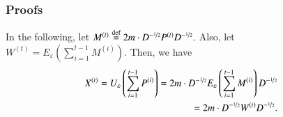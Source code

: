 \documentclass[twoside,leqno,twocolumn]{article}
\newcommand{\nfrac}{\nicefrac}
\renewcommand{\leq}{\leqslant}
\newcommand{\cI}{\mathcal I}
\newcommand{\defeq}{\stackrel{\textup{def}}{=}}
\newcommand{\Tr}{{\rm Tr}}
\newcommand{\e}{\epsilon}
\let\e\varepsilon
\newcommand{\Degin}{D^{-\nfrac{1}{2}}}
\numberwithin{equation}{section}
\begin{document}
\begin{comment}
\begin{proof}
Let $W_{t+1} \defeq \exp\left(-\e \sum_{i=1}^t Y^{(i)}\right).$
Notice:
$$
\cI \bullet W^{(t+1)} = \Tr\left(W^{(t+1)}\right) - \hat{v}^T W^{(t+1)} \hat{v} = \Tr\left(\exp\left(-\e \sum_{i=1}^t Y^{(i)}\right)\right) - 1. 
$$
By the Golden-Thompson Inequality we have:
$$
\Tr\left(\exp\left(-\e \sum_{i=1}^t Y^{(i)}\right)\right) \leq \Tr\left(W^{(t)} \exp\left(-\e Y^{(i)}\right)\right).
$$
Moreover, by Fact \ref{fct:exp}
$$
\Tr\left(W^{(t)} \exp\left(-\e Y^{(t)}\right)\right) = \cI \bullet \left(W^{(t)} \exp\left(-\e Y^{(t)}\right)\right) + \hat{v}^T \left(W^{(t)} \exp\left(-\e Y^{(t)}\right)\right) \hat{v} = \cI \bullet \left(W^{(t)} \exp\left(-\e Y^{(i)}\right)\right) + 1.
$$
Hence,
\begin{eqnarray*}
\cI \bullet W^{(t+1)} \leq  \cI \bullet \left(W^{(t)} \exp\left(-\e Y^{(t)}\right)\right) \leq \cI \bullet \left(W^{(t)} \left(I - (1 - e^{-\e}) Y^{(t)}\right)\right)= \left(\cI \bullet W^{(t)}\right) \cdot \left(1-(1-e^{-\e})\cdot Z^{(t)} \bullet Y^{(t)}\right)\\
\leq \exp\left(-(1-e^{-\e})\cdot Z^{(t)} \bullet Y^{(t)}\right) \cdot \left(\cI \bullet W^{(t)}\right).  
\end{eqnarray*}
Iterating this argument over $t \in [T],$ we obtain:
$$
\cI \bullet \exp\left(-\e \sum_{t=1}^{T} Y^{(t)}\right) \leq \cI \bullet W^{(T+1)} \leq \exp\left(-(1 - e^{-\e}) \cdot \sum_{t=1}^T Z^{(t)} \bullet Y^{(t)}\right) \cdot \cI \bullet W^{(1)} =  \exp\left(-(1 - e^{-\e}) \cdot \sum_{t=1}^T Z^{(t)} \bullet Y^{(t)}\right) \cdot (n-1).
$$
\end{proof}
By taking logs this implies:
$$
\sum_{t=1}^T Y^{(t)} \succeq \left(-\frac{\log n}{\e} + \frac{1 - e^{-\e}}{\e} \cdot \sum_{t=1}^T Z^{(t)} \bullet Y^{(t)} \right).
$$
Finally, using the fact that $e^{-\e} \leq 1 - \e + \e^2$ yields the required result.
\end{comment}
\subsubsection{Proofs}

 In the following, let $M^{(t)} \defeq 2m \cdot \Degin P^{(t)} \Degin.$ Also, let
$
W^{(t)} = E_\e\left(\sum_{i=1}^{t-1} M^{(i)}\right).
$
Then,  we have 
\begin{align*}
X^{(t)} = U_\e\left(\sum_{i=1}^{t-1} P^{(i)}\right) = 2m \cdot \Degin E_\e\left(\sum_{i=1}^{t-1} M^{(i)}\right) \Degin\\ = 2m \cdot \Degin W^{(t)} \Degin.
\end{align*}
\end{document}
